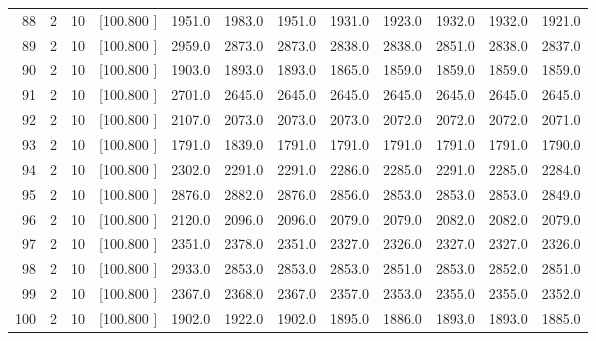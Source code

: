 \documentclass[12pt,a4paper]{article}
\begin{document}
\begin{center}
{\begin{tabular}{r r r r r r r r r r r r}
  88&  2& 10&[100.800   ]&  1951.0&  1983.0&  1951.0&  1931.0&  1923.0&  1932.0&  1932.0&  1921.0\\[-0.02in]
  89&  2& 10&[100.800   ]&  2959.0&  2873.0&  2873.0&  2838.0&  2838.0&  2851.0&  2838.0&  2837.0\\[-0.02in]
  90&  2& 10&[100.800   ]&  1903.0&  1893.0&  1893.0&  1865.0&  1859.0&  1859.0&  1859.0&  1859.0\\[-0.02in]
  91&  2& 10&[100.800   ]&  2701.0&  2645.0&  2645.0&  2645.0&  2645.0&  2645.0&  2645.0&  2645.0\\[-0.02in]
  92&  2& 10&[100.800   ]&  2107.0&  2073.0&  2073.0&  2073.0&  2072.0&  2072.0&  2072.0&  2071.0\\[-0.02in]
  93&  2& 10&[100.800   ]&  1791.0&  1839.0&  1791.0&  1791.0&  1791.0&  1791.0&  1791.0&  1790.0\\[-0.02in]
  94&  2& 10&[100.800   ]&  2302.0&  2291.0&  2291.0&  2286.0&  2285.0&  2291.0&  2285.0&  2284.0\\[-0.02in]
  95&  2& 10&[100.800   ]&  2876.0&  2882.0&  2876.0&  2856.0&  2853.0&  2853.0&  2853.0&  2849.0\\[-0.02in]
  96&  2& 10&[100.800   ]&  2120.0&  2096.0&  2096.0&  2079.0&  2079.0&  2082.0&  2082.0&  2079.0\\[-0.02in]
  97&  2& 10&[100.800   ]&  2351.0&  2378.0&  2351.0&  2327.0&  2326.0&  2327.0&  2327.0&  2326.0\\[-0.02in]
  98&  2& 10&[100.800   ]&  2933.0&  2853.0&  2853.0&  2853.0&  2851.0&  2853.0&  2852.0&  2851.0\\[-0.02in]
  99&  2& 10&[100.800   ]&  2367.0&  2368.0&  2367.0&  2357.0&  2353.0&  2355.0&  2355.0&  2352.0\\[-0.02in]
 100&  2& 10&[100.800   ]&  1902.0&  1922.0&  1902.0&  1895.0&  1886.0&  1893.0&  1893.0&  1885.0\\[-0.02in]

\hline
\end{tabular}}
\end{center}
\end{document}
